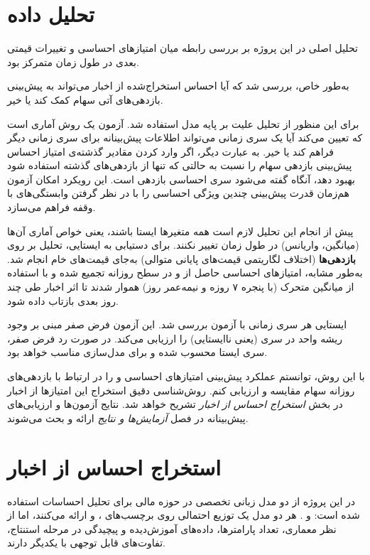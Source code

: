 \documentclass[12pt, a4paper]{report}
\begin{document}
\section{تحلیل داده}

تحلیل اصلی در این پروژه بر بررسی رابطه میان امتیازهای احساسی و تغییرات قیمتی بعدی در طول زمان متمرکز بود.
 
به‌طور خاص، بررسی شد که آیا احساس استخراج‌شده از اخبار می‌تواند به پیش‌بینی بازدهی‌های آتی سهام کمک کند یا خیر.  

برای این منظور از تحلیل علیت  بر پایه مدل  استفاده شد. 
آزمون  یک روش آماری است که تعیین می‌کند آیا یک سری زمانی می‌تواند اطلاعات پیش‌بینانه برای سری زمانی دیگر فراهم کند یا خیر. 
به عبارت دیگر، اگر وارد کردن مقادیر گذشته‌ی امتیاز احساس پیش‌بینی بازدهی سهام را نسبت به حالتی که تنها از بازدهی‌های گذشته استفاده شود بهبود دهد، آنگاه گفته می‌شود سری احساسی  بازدهی است. 
این رویکرد امکان آزمون هم‌زمان قدرت پیش‌بینی چندین ویژگی احساسی را با در نظر گرفتن وابستگی‌های با وقفه فراهم می‌سازد.  

پیش از انجام این تحلیل لازم است همه متغیرها ایستا باشند، یعنی خواص آماری آن‌ها (میانگین، واریانس) در طول زمان تغییر نکنند. 
برای دستیابی به ایستایی، تحلیل بر روی \textbf{بازدهی‌ها} (اختلاف لگاریتمی قیمت‌های پایانی متوالی) به‌جای قیمت‌های خام انجام شد. 
به‌طور مشابه، امتیازهای احساسی حاصل از  و  در سطح روزانه تجمیع شده و با استفاده از میانگین متحرک (با پنجره ۷ روزه و نیمه‌عمر  روز) هموار شدند تا اثر اخبار طی چند روز بعدی بازتاب داده شود.  

ایستایی هر سری زمانی با آزمون  بررسی شد. 
این آزمون فرض صفر مبنی بر وجود ریشه واحد در سری (یعنی ناایستایی) را ارزیابی می‌کند. 
در صورت رد فرض صفر، سری ایستا محسوب شده و برای مدل‌سازی  مناسب خواهد بود.  

با این روش، توانستم عملکرد پیش‌بینی امتیازهای احساسی  و  را در ارتباط با بازدهی‌های روزانه سهام مقایسه و ارزیابی کنم. 
روش‌شناسی دقیق استخراج این امتیازها از اخبار در بخش \textit{استخراج احساس از اخبار} تشریح خواهد شد. 
نتایج آزمون‌ها و ارزیابی‌های پیش‌بینانه در فصل \textit{آزمایش‌ها و نتایج} ارائه و بحث می‌شوند.  


\section{استخراج احساس از اخبار}
\label{sec:sentiment_extraction}

در این پروژه از دو مدل زبانی تخصصی در حوزه مالی برای تحلیل احساسات استفاده شده است: 
\textbf{} و \textbf{}. 
هر دو مدل یک توزیع احتمالی روی برچسب‌های ،  و  ارائه می‌کنند، 
اما از نظر معماری، تعداد پارامترها، داده‌های آموزش‌دیده و پیچیدگی در مرحله استنتاج، تفاوت‌های قابل توجهی با یکدیگر دارند.  
\end{document}
